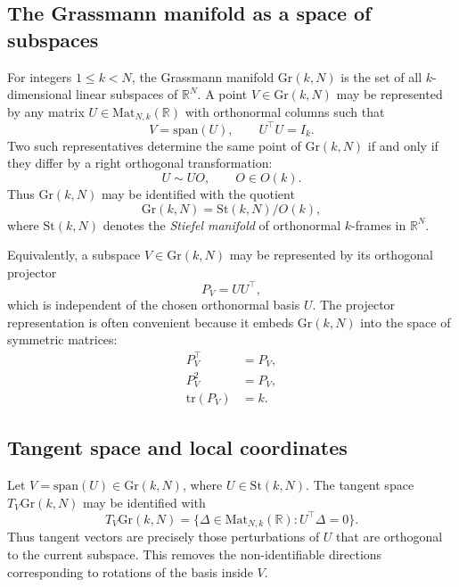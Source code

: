\documentclass[11pt,letterpaper]{article}
\newcommand{\gr}{\mathrm{Gr}}
\newcommand{\tr}{\mathrm{tr}}
\newcommand{\bR}{\mathbb{R}}
\begin{document}
\subsection{The Grassmann manifold as a space of subspaces}

For integers $1 \le k < N$, the Grassmann manifold $\gr(k,N)$ is the set of all $k$-dimensional linear subspaces of $\bR^N$. A point $V\in \gr(k,N)$ may be represented by any matrix $U\in\mathrm{Mat}_{N,k}(\bR)$ with orthonormal columns such that
\begin{equation*}
V=\mathrm{span}(U), \qquad U^\top U = I_k.
\end{equation*}
Two such representatives determine the same point of $\gr(k,N)$ if and only if they differ by a right orthogonal transformation:
\begin{equation*}
U \sim UO, \qquad O\in O(k).
\end{equation*}
Thus $\gr(k,N)$ may be identified with the quotient
\begin{equation*}
\gr(k,N) = \mathrm{St}(k,N)/O(k),
\end{equation*}
where $\mathrm{St}(k,N)$ denotes the \emph{Stiefel manifold} of orthonormal $k$-frames in $\bR^N$.

Equivalently, a subspace $V\in \gr(k,N)$ may be represented by its orthogonal projector
\begin{equation*}
P_V = UU^\top,
\end{equation*}
which is independent of the chosen orthonormal basis $U$. The projector representation is often convenient because it embeds $\gr(k,N)$ into the space of symmetric matrices:
\begin{equation*}
\begin{split}
P_V^\top &= P_V,\\
P_V^2 &= P_V,\\
\tr(P_V)&=k.
\end{split}
\end{equation*}

\subsection{Tangent space and local coordinates}

Let $V=\mathrm{span}(U)\in \gr(k,N)$, where $U\in \mathrm{St}(k,N)$. The tangent space $T_V\gr(k,N)$ may be identified with
\begin{equation*}
T_V\gr(k,N)= \big\{\Delta\in\mathrm{Mat}_{N,k}(\bR) : U^\top \Delta = 0\big\}.
\end{equation*}
Thus tangent vectors are precisely those perturbations of $U$ that are orthogonal to the current subspace. This removes the non-identifiable directions corresponding to rotations of the basis inside $V$.
\end{document}
